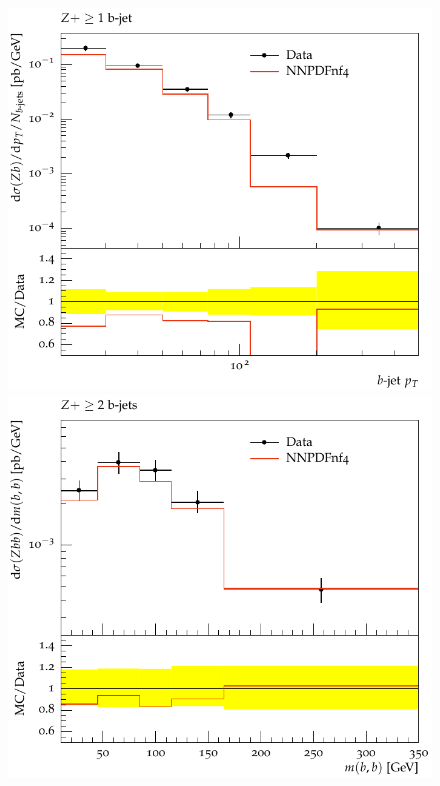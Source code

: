 \documentclass[11pt]{cernrep} \usepackage{graphicx,epsfig} 
\begin{document}
\begin{figure}[htbp]
\begin{center}
   \includegraphics[scale=0.65]{figs/zbb/herwig4F/d03-x01-y01.pdf} 
   \includegraphics[scale=0.65]{figs/zbb/herwig4F/d23-x01-y01.pdf} \\

\end{center}
\end{figure}
\end{document}
